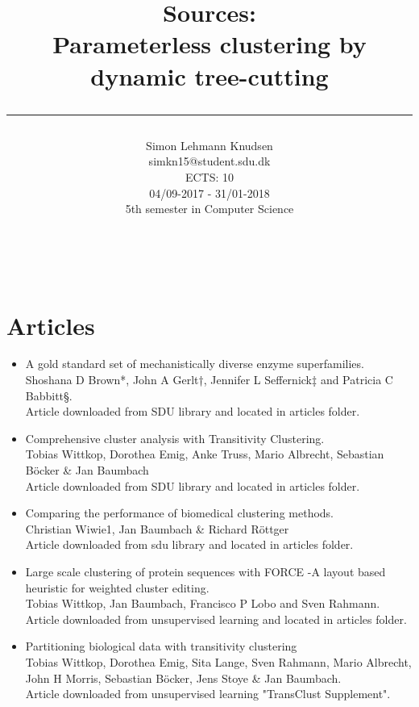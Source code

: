 \documentclass[a4paper,10pt]{article}
\title{ Sources: \\Parameterless clustering by dynamic tree-cutting \\ \rule{10cm}{0.5mm}}
\author{Simon Lehmann Knudsen \\
	simkn15@student.sdu.dk \\
	ECTS: 10 \\
	04/09-2017 - 31/01-2018 \\
	5th semester in Computer Science
\\\rule{5.5cm}{0.5mm}\\}
\begin{document}
\maketitle

\tableofcontents

\newpage
\section{Articles}
\begin{itemize}
	\item A gold standard set of mechanistically diverse enzyme superfamilies. \\ Shoshana D Brown*, John A Gerlt†, Jennifer L Seffernick‡ and
	Patricia C Babbitt§. \\
	Article downloaded from SDU library and located in articles folder.
	
	\item Comprehensive cluster analysis with Transitivity Clustering. \\
	Tobias Wittkop, Dorothea Emig, Anke Truss, Mario Albrecht, Sebastian Böcker \& Jan Baumbach \\
	Article downloaded from SDU library and located in articles folder.
	
	\item Comparing the performance of biomedical clustering
	methods. \\
	Christian Wiwie1, Jan Baumbach \& Richard Röttger \\
	Article downloaded from sdu library and located in articles folder.
	
	\item Large scale clustering of protein sequences with FORCE -A layout
	based heuristic for weighted cluster editing. \\
	Tobias Wittkop, Jan Baumbach, Francisco P Lobo and
	Sven Rahmann. \\
	Article downloaded from unsupervised learning and located in articles folder.
	
	\item Partitioning biological data with transitivity clustering \\
	Tobias Wittkop, Dorothea Emig, Sita Lange, Sven Rahmann, Mario Albrecht, John H
	Morris, Sebastian Böcker, Jens Stoye \& Jan Baumbach. \\
	Article downloaded from unsupervised learning "TransClust Supplement".
	

\end{itemize}
\end{document}
